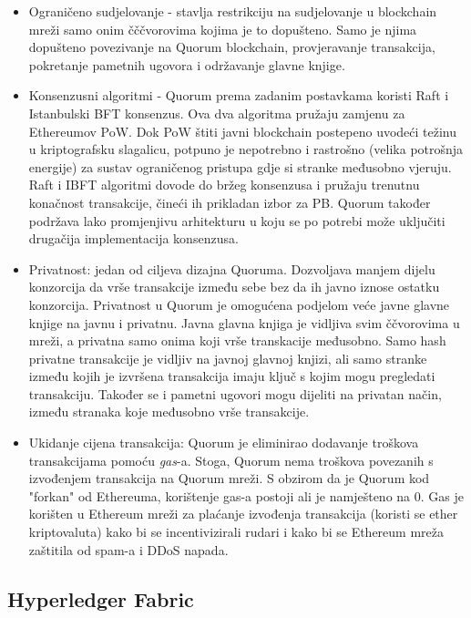 \documentclass[times, utf8, diplomski]{fer}
\begin{document}
\begin{itemize}

\item Ograničeno sudjelovanje - stavlja restrikciju na sudjelovanje u blockchain mreži samo onim čččvorovima kojima je to dopušteno. Samo je njima dopušteno povezivanje na Quorum blockchain, provjeravanje transakcija, pokretanje pametnih ugovora i održavanje glavne knjige.

\item Konsenzusni algoritmi - Quorum prema zadanim postavkama koristi Raft i Istanbulski BFT konsenzus. Ova dva algoritma pružaju zamjenu za Ethereumov PoW. Dok PoW štiti javni blockchain postepeno uvodeći težinu u kriptografsku slagalicu, potpuno je nepotrebno i rastrošno (velika potrošnja energije) za sustav ograničenog pristupa gdje si stranke međusobno vjeruju. Raft i IBFT algoritmi dovode do bržeg konsenzusa i pružaju trenutnu konačnost transakcije, čineći ih prikladan izbor za PB. Quorum također podržava lako promjenjivu arhitekturu u koju se po potrebi može uključiti drugačija implementacija konsenzusa.

\item Privatnost: jedan od ciljeva dizajna Quoruma. Dozvoljava manjem dijelu konzorcija da vrše transakcije između sebe bez da ih javno iznose ostatku konzorcija. Privatnost u Quorum je omogućena podjelom veće javne glavne knjige na javnu i privatnu. Javna glavna knjiga je vidljiva svim ččvorovima u mreži, a privatna samo onima koji vrše transkacije međusobno. Samo hash privatne transakcije je vidljiv na javnoj glavnoj knjizi, ali samo stranke između kojih je izvršena transakcija imaju ključ s kojim mogu pregledati transakciju. Također se i pametni ugovori mogu dijeliti na privatan način, između stranaka koje međusobno vrše transakcije.

\item Ukidanje cijena transakcija: Quorum je eliminirao dodavanje troškova transakcijama pomoću \textit{gas}-a. Stoga, Quorum nema troškova povezanih s izvođenjem transakcija na Quorum mreži. S obzirom da je Quorum kod "forkan" od Ethereuma, korištenje gas-a postoji ali je namješteno na 0. Gas je korišten u Ethereum mreži za plaćanje izvođenja transakcija (koristi se ether kriptovaluta) kako bi se incentivizirali rudari i kako bi se Ethereum mreža zaštitila od spam-a i DDoS napada.

\end{itemize}

\subsection{Hyperledger Fabric}
\end{document}
